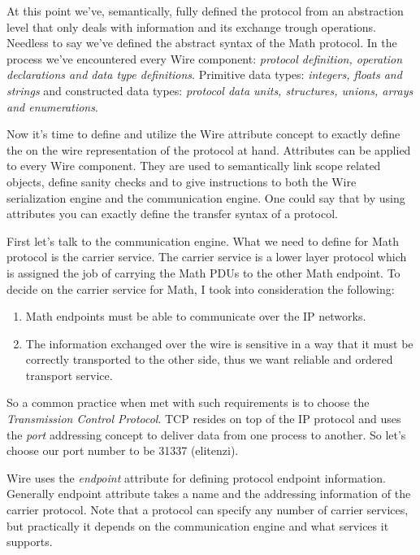 \documentclass[times, utf8, diplomski]{fer}
\begin{document}
At this point we've, semantically, fully defined the protocol from an abstraction 
level that only deals with information and its exchange trough operations. 
Needless to say we've defined the abstract syntax of the Math protocol. 
In the process we've encountered every Wire component: \emph{protocol definition, 
operation declarations and data type definitions}. 
Primitive data types: \emph{integers, floats and strings} and constructed data 
types: \emph{protocol data units, structures, unions, arrays and enumerations}.

Now it's time to define and utilize the Wire attribute concept to exactly define 
the on the wire representation of the protocol at hand. Attributes can be applied 
to every Wire component. They are used to semantically link scope related objects,
define sanity checks and to give instructions to both the Wire serialization engine 
and the communication engine. One could say that by using attributes you can 
exactly define the transfer syntax of a protocol.

First let's talk to the communication engine. What we need to define for Math 
protocol is the carrier service. The carrier service is a lower layer protocol 
which is assigned the job of carrying the Math PDUs to the other Math endpoint.
To decide on the carrier service for Math, I took into consideration the following:
\begin{enumerate}
	\item Math endpoints must be able to communicate over the IP networks.
	\item The information exchanged over the wire is sensitive in a way that it 
		must be correctly transported to the other side, thus we want reliable 
		and ordered transport service.
\end{enumerate}

So a common practice when met with such requirements is to choose the 
\emph{Transmission Control Protocol}. TCP resides on top of the IP protocol and 
uses the \emph{port} addressing concept to deliver data from one process to another. 
So let's choose our port number to be 31337 (elitenzi).

Wire uses the \emph{endpoint} attribute for defining protocol endpoint information. 
Generally endpoint attribute takes a name and the addressing information of the 
carrier protocol. Note that a protocol can specify any number of carrier services, 
but practically it depends on the communication engine and what services it supports.
\end{document}
